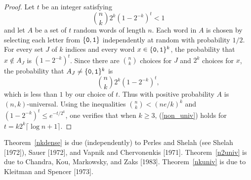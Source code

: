 \documentclass[12pt]{article}
\begin{document}
\begin{proof}
Let $t$ be an integer satisfying
\begin{equation}\label{non_univ}
{n \choose k}2^k(1-2^{-k})^t < 1
\end{equation}
and let $A$ be a set of $t$ random words of length $n$.  Each word in $A$
is chosen by selecting each letter from $\{{\tt 0,1}\}$ independently
at random with probability $1/2$.  For every set $J$ of $k$ indices
and every word $x \in \{{\tt 0,1}\}^k$, the probability that $x \notin
A_J$ is $(1-2^{-k})^t$.  Since there are ${n \choose k}$ choices for
$J$ and $2^k$ choices for $x$, the probability that $A_J \neq \{{\tt
0,1}\}^k$ is
\[
{n \choose k}2^k(1-2^{-k})^t,
\]
which is less than $1$ by our choice of $t$.  Thus with positive
probability $A$ is $(n,k)$-universal.
Using the inequalities ${n \choose k} < (ne/k)^k$ and $(1-2^{-k})^t
\leq e^{-t/2^k}$, one verifies that when $k \geq 3$, (\ref{non_univ})
holds for $t = k2^k\lceil\log n + 1\rceil$.
\end{proof}

Theorem~\ref{nkdense} is due (independently) to Perles and Shelah (see
Shelah [1972]), Sauer [1972], and Vapnik and Chervonenkis [1971].
Theorem~\ref{n2univ} is due to Chandra, Kou, Markowsky, and Zaks
[1983].  Theorem~\ref{nkuniv} is due to Kleitman and Spencer [1973].
\end{document}
